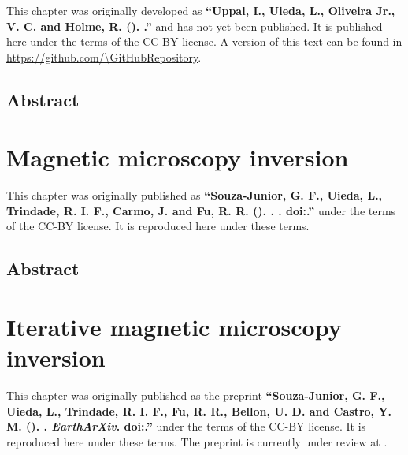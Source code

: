 \documentclass[10pt,a4paper,oneside]{book}
\begin{document}
\begin{summarybox}
    \noindent
    This chapter was originally developed as
    \textbf{``Uppal, I., Uieda, L., Oliveira Jr., V. C. and Holme, R. (\Year).
    \Title{}.''} and has not yet been published.
    It is published here under the terms of the CC-BY license.
    A version of this text can be found in
    \url{https://github.com/\GitHubRepository}.
\end{summarybox}

\section*{Abstract}


% 
\endgroup

\chapter{Magnetic microscopy inversion}

\begingroup


\begin{summarybox}
    \noindent
    This chapter was originally published as
    \textbf{``Souza-Junior, G. F., Uieda, L., Trindade, R. I. F., Carmo, J. and
        Fu, R. R. (\Year). \Title{}. \textit{\Journal{}}.
    doi:\href{https://doi.org/\JournalDOI}{\JournalDOI}.''} under the
    terms of the CC-BY license. It is reproduced here under these terms.
\end{summarybox}

\section*{Abstract}


% 
\endgroup

\chapter{Iterative magnetic microscopy inversion}

\begingroup


\begin{summarybox}
    \noindent
    This chapter was originally published as the preprint
    \textbf{``Souza-Junior, G. F., Uieda, L., Trindade, R. I. F., Fu, R. R.,
    Bellon, U. D. and Castro, Y. M. (\Year). \Title{}. \textit{EarthArXiv}.
    doi:\href{https://doi.org/\PreprintDOI}{\PreprintDOI}.''} under the
    terms of the CC-BY license. It is reproduced here under these terms.
    The preprint is currently under review at \textit{\Journal{}}.
\end{summarybox}
\end{document}
